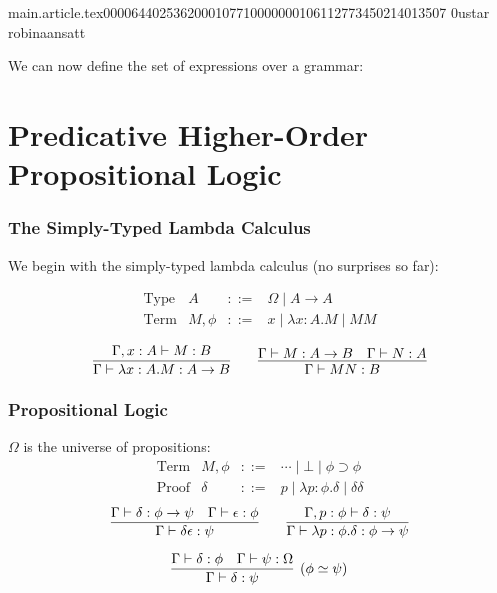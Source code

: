 main.article.tex                                                                                    0000644 0253620 0010771 00000001061 12773450214 013507  0                                                                                                    ustar   robina                          ansatt                                                                                                                                                                                                                 \documentclass{article}
\begin{document}
\begin{frame}[fragile]
We can now define the set of expressions over a grammar:
\small{
}
\end{frame}

\section{Predicative Higher-Order Propositional Logic}

\begin{frame}
\frametitle{The Simply-Typed Lambda Calculus}
We begin with the simply-typed lambda calculus (no surprises so far):

$$
\begin{array}{lrcl}
\text{Type} & A & ::= & \Omega \mid A \rightarrow A \\
\text{Term} & M,\phi & ::= & x \mid \lambda x:A.M \mid M M
\end{array}
$$

\[ \infer{\Gamma \vdash \lambda x:A.M : A \rightarrow B}{\Gamma, x : A \vdash M : B} \qquad
\infer{\Gamma \vdash M N : B} {\Gamma \vdash M : A \rightarrow B \quad \Gamma \vdash N : A} \]
\end{frame}

\begin{frame}[fragile]
\frametitle{Propositional Logic}
$\Omega$ is the universe of propositions:
\[
\begin{array}{lrcl}
\text{Term} & M,\phi & ::= & \cdots \mid \bot \mid \phi \supset \phi \\
\text{Proof} & \delta & ::= & p \mid \lambda p : \phi . \delta \mid \delta \delta
\end{array}
\]
\[ \infer{\Gamma \vdash \delta \epsilon : \psi} {\Gamma \vdash \delta : \phi \rightarrow \psi \quad \Gamma \vdash \epsilon : \phi}
\qquad \infer{\Gamma \vdash \lambda p : \phi . \delta : \phi \rightarrow \psi}{\Gamma, p : \phi \vdash \delta : \psi} \]

\[ \infer[(\phi \simeq \psi)]{\Gamma \vdash \delta : \psi}{\Gamma \vdash \delta : \phi \quad \Gamma \vdash \psi : \Omega} \]
\end{frame}
\end{document}
